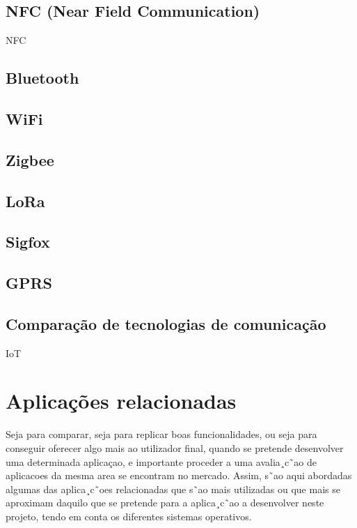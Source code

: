 \subsection{NFC (Near Field Communication)}

\ac{NFC}


\subsection{Bluetooth}


\subsection{WiFi}

\subsection{Zigbee}



\subsection{LoRa}

\subsection{Sigfox}


\subsection{GPRS}



\subsection{Comparação de tecnologias de comunicação}





\ac{IoT}


\section{Aplicações relacionadas}

Seja para comparar, seja para replicar boas funcionalidades, ou seja para conseguir oferecer
algo mais ao utilizador final, quando se pretende desenvolver uma determinada aplicaçao, e
importante proceder a uma avalia¸c˜ao de aplicacoes da mesma area se encontram no mercado.
Assim, s˜ao aqui abordadas algumas das aplica¸c˜oes relacionadas que s˜ao mais utilizadas ou
que mais se aproximam daquilo que se pretende para a aplica¸c˜ao a desenvolver neste projeto,
tendo em conta os diferentes sistemas operativos.

